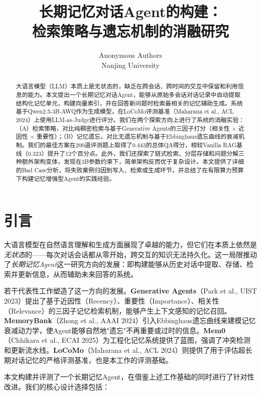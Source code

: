 \documentclass[11pt,a4paper]{ctexart}
\title{\Large\textbf{长期记忆对话Agent的构建：\\检索策略与遗忘机制的消融研究}}
\author{
  Anonymous Authors \\
  Nanjing University
}
\date{}
\begin{document}
\maketitle

\begin{abstract}
大语言模型（LLM）本质上是无状态的，缺乏在跨会话、跨时间的交互中保留和利用信息的能力。本文提出一个长期记忆对话Agent，能够从原始多会话对话记录中自动提取结构化记忆单元，构建向量索引，并在回答新问题时检索最相关的记忆辅助生成。系统基于Qwen2.5-3B-AWQ作为生成模型，在LoCoMo评测基准（Maharana et al., ACL 2024）上使用LLM-as-Judge进行评分。我们在两个探索方向上进行了系统的消融实验：（A）检索策略，对比纯稠密检索与基于Generative Agents的三因子打分（相关性 $\times$ 近因性 $\times$ 重要性）；（B）记忆遗忘，对比无遗忘机制与基于Ebbinghaus遗忘曲线的衰减机制。我们的最佳方案在200道评测题上取得了0.443的总体QA得分，相较Vanilla RAG基线（0.323）提升了12个百分点。此外，我们还探索了链式检索、分层存储和问题分解三种额外架构变体，发现在3B参数约束下，简单架构反而优于复杂设计。本文提供了详细的Bad Case分析，将失败案例归因到写入、检索或生成环节，并总结了在有限算力预算下构建记忆增强型Agent的实践经验。
\end{abstract}

\section{引言}

大语言模型在自然语言理解和生成方面展现了卓越的能力，但它们在本质上依然是\emph{无状态}的——每次对话会话都从零开始，跨交互的知识无法持久化。这一局限推动了\emph{长期记忆Agent}这一研究方向的发展：即构建能够从历史对话中提取、存储、检索并更新信息，从而辅助未来回答的系统。

若干代表性工作塑造了这一方向的发展。\textbf{Generative Agents}（Park et al., UIST 2023）提出了基于近因性（Recency）、重要性（Importance）、相关性（Relevance）的三因子记忆检索机制，能够产生上下文感知的记忆召回。\textbf{MemoryBank}（Zhong et al., AAAI 2024）引入Ebbinghaus遗忘曲线来建模记忆衰减动力学，使Agent能够自然地"遗忘"不再重要或过时的信息。\textbf{Mem0}（Chhikara et al., ECAI 2025）为工程化记忆系统提供了蓝图，强调了冲突检测和更新流水线。\textbf{LoCoMo}（Maharana et al., ACL 2024）则提供了用于评估超长期对话记忆的严格评测基准，也是本工作的评测基础。

本文构建并评测了一个长期记忆Agent，在借鉴上述工作基础的同时进行了针对性改进。我们的核心设计选择包括：
\end{document}
